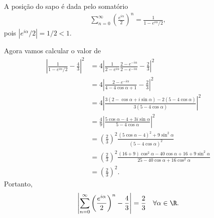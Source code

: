 \begin{questions}
%
\begin{solution}
    A posição do sapo é dada pelo somatório
    \begin{align}
        \sum_{n=0}^\infty \left(\frac{e^{i\alpha}}{2}\right)^n
            = \frac{1}{1 - e^{i\alpha}/2},
    \end{align}
    pois $|e^{i\alpha}/2| = 1/2 < 1$.
    
    Agora vamos calcular o valor de
    \begin{align*}
        \left| \frac{1}{1 - e^{i\alpha}/2} - \frac{4}{3} \right|^2
            &= 4 \left| \frac{1}{2 - e^{i\alpha}} \frac{2 - e^{-i\alpha}}{2 - e^{-i\alpha}} - \frac{2}{3} \right|^2 \\
            &= 4 \left| \frac{2 - e^{-i\alpha}}{4 - 4 \cos\alpha + 1} - \frac{2}{3} \right|^2 \\
            &= 4 \left| \frac{3(2 - \cos\alpha + i \sin\alpha) - 2 (5-4\cos\alpha) }{3(5 - 4 \cos\alpha)}\right|^2 \\
            &= \frac{4}{9} \left| \frac{5 \cos\alpha - 4 + 3i\sin\alpha}{5 - 4 \cos\alpha} \right|^2 \\
            &= \left( \frac{2}{3} \right)^2 \frac{(5 \cos\alpha - 4)^2 + 9\sin^2\alpha}{(5 - 4 \cos\alpha)^2} \\
            &= \left( \frac{2}{3} \right)^2 \frac{(16+9)\cos^2\alpha -40\cos\alpha + 16 + 9\sin^2\alpha}{ 25 - 40\cos\alpha + 16\cos^2\alpha} \\
            &= \left( \frac{2}{3} \right)^2.
    \end{align*}
    Portanto,
    \[ \left| \sum_{n=0}^\infty \left(\frac{e^{i\alpha}}{2}\right)^n - \frac{4}{3} \right| = \frac{2}{3} \quad \forall \alpha\in\R.\]
\end{solution}

\end{questions}
